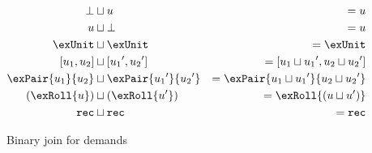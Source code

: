 \begin{figure}
\small{
\begin{align*}
\bot
&\join
u
&=
u
\\
u
&\join
\bot
&=
u
\\
\exUnit
&\join
\exUnit
&=
\exUnit
\\
\exInlr{u_1}{u_2}
&\join
\exInlr{{u_1}'}{{u_2}'}
&=
\exInlr{u_1 \join {u_1}'}{u_2 \join {u_2}'}
\\
\exPair{u_1}{u_2}
&\join
\exPair{{u_1}'}{{u_2}'}
&=
\exPair{u_1 \join {u_1}'}{u_2 \join {u_2}'}
\\
(\exRoll{u})
&\join
(\exRoll{u'})
&=
\exRoll{(u \join u')}
\\
\exRecDemand
&\join
\exRecDemand
&=
\exRecDemand
\end{align*}
}
\caption{Binary join for demands}
\end{figure}
